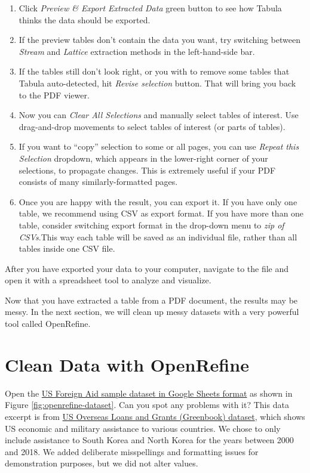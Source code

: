 \documentclass[
  english,
]{book}
\begin{document}
\begin{enumerate}
\def\labelenumi{\arabic{enumi}.}
\setcounter{enumi}{4}
\item
  Click \emph{Preview \& Export Extracted Data} green button to see how Tabula thinks the data should be exported.
\item
  If the preview tables don't contain the data you want, try switching between \emph{Stream} and \emph{Lattice} extraction methods in the left-hand-side bar.
\item
  If the tables still don't look right, or you with to remove some tables that Tabula auto-detected, hit \emph{Revise selection} button. That will bring you back to the PDF viewer.
\item
  Now you can \emph{Clear All Selections} and manually select
  tables of interest. Use drag-and-drop movements to select tables of interest (or parts of tables).
\item
  If you want to ``copy'' selection to some or all pages, you can use \emph{Repeat this Selection} dropdown, which appears in the lower-right corner of your selections, to propagate changes. This is extremely useful if your PDF consists of many similarly-formatted pages.
\item
  Once you are happy with the result, you can export it. If you have only one table, we recommend using CSV as export format. If you have more than one table, consider switching export format in the drop-down menu to \emph{zip of CSVs}.This way each table will be saved as an individual file, rather than all tables inside one CSV file.
\end{enumerate}

After you have exported your data to your computer, navigate to the file and open it with a spreadsheet tool to analyze and visualize.

Now that you have extracted a table from a PDF document, the results may be messy. In the next section, we will clean up messy datasets with a very powerful tool called OpenRefine.

\hypertarget{open-refine}{%
\section*{Clean Data with OpenRefine}\label{open-refine}}

Open the \href{https://docs.google.com/spreadsheets/d/19BilYJxd0fgi7MTAa2y9NUF65Xqf2_y_dVr1jPbmWeg/edit\#gid=1983762503}{US Foreign Aid sample dataset in Google Sheets format} as shown in Figure \ref{fig:openrefine-dataset}. Can you spot any problems with it? This data excerpt is from \href{https://catalog.data.gov/dataset/u-s-overseas-loans-and-grants-greenbook}{US Overseas Loans and Grants (Greenbook) dataset}, which shows US economic and military assistance to various countries.
We chose to only include assistance to South Korea and North Korea for the years between 2000 and 2018. We added deliberate misspellings and formatting issues for demonstration purposes, but we did not alter values.
\end{document}
